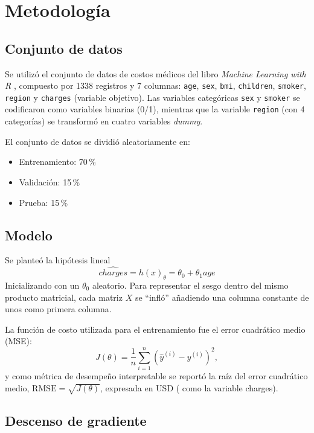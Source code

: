 \documentclass[journal]{IEEEtran}
\begin{document}
\section{Metodología}

\subsection{Conjunto de datos}

Se utilizó el conjunto de datos de costos médicos del libro \emph{Machine Learning with R} \cite{lantz2015}, compuesto por 1338 registros y 7 columnas: \texttt{age}, \texttt{sex}, \texttt{bmi}, \texttt{children}, \texttt{smoker}, \texttt{region} y \texttt{charges} (variable objetivo). Las variables categóricas \texttt{sex} y \texttt{smoker} se codificaron como variables binarias (0/1), mientras que la variable \texttt{region} (con 4 categorías) se transformó en cuatro variables \emph{dummy}.

El conjunto de datos se dividió aleatoriamente en:
\begin{itemize}
    \item Entrenamiento: 70\,\% 
    \item Validación: 15\,\% 
    \item Prueba: 15\,\% 
\end{itemize}

\subsection{Modelo}

Se planteó la hipótesis lineal
\begin{equation}
\hat{charges} = h(x)_\theta=\theta_0+\theta_1 age
\label{eq:hipotesis}
\end{equation}
Inicializando con un $\theta_0$ aleatorio. Para representar el sesgo dentro del mismo producto matricial, cada matriz $X$ se ``infló'' añadiendo una columna constante de unos como primera columna.

La función de costo utilizada para el entrenamiento fue el error cuadrático medio (MSE):
\begin{equation}
J(\theta) = \frac{1}{n}\sum_{i=1}^{n}\left(\hat{y}^{(i)} - y^{(i)}\right)^2,
\label{eq:mse}
\end{equation}
y como métrica de desempeño interpretable se reportó la raíz del error cuadrático medio, $\text{RMSE} = \sqrt{J(\theta)}$, expresada en USD ( como la variable charges).

\subsection{Descenso de gradiente}
\end{document}
